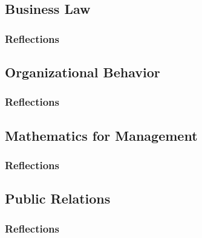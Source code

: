 \documentclass[12pt,titlepage]{article}
\begin{document}
\subsection{Business Law}
\subsubsection{Reflections}

\subsection{Organizational Behavior}
\subsubsection{Reflections}




\subsection{Mathematics for Management}
\subsubsection{Reflections}


\restoregeometry


\subsection{Public Relations}
\subsubsection{Reflections}

\end{document}
